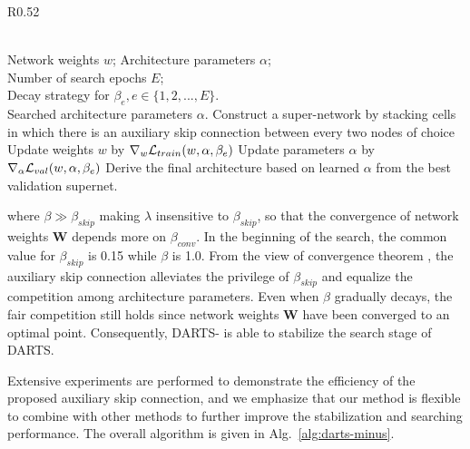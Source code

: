\documentclass{article} \usepackage{iclr2021_conference,times}
\begin{document}
\begin{wrapfigure}[17]{R}{0.52\textwidth}
\vspace{-22pt}
 \begin{minipage}{0.52\textwidth}
\begin{algorithm}[H]
	\caption{DARTS-}
	\label{alg:darts-minus}
	\begin{algorithmic}[1]
		\REQUIRE~~\\
		Network weights $w$; Architecture parameters $\alpha$;  \\
		Number of search epochs $E$; \\
		Decay strategy for $\beta_e, e\in\{ 1,2,..., E\}$.
                \ENSURE ~~\\
                Searched architecture parameters $\alpha$.
\STATE Construct a super-network by stacking cells in which there is an auxiliary skip connection between every two nodes of choice
		\STATE Update weights $w$ by  $\nabla_{w}{\cal L}_{train}(w, \alpha, \beta_e)$
		\STATE Update parameters $\alpha$  by  $\nabla_{\alpha }{\cal L}_{val}(w, \alpha, \beta_e)$
		\ENDFOR
\STATE Derive the final architecture based on learned $\alpha$ from the best validation supernet.
	\end{algorithmic}
\end{algorithm}
\end{minipage}
\end{wrapfigure}
where $\beta \gg \beta_{skip}$ making $\lambda$ insensitive to $\beta_{skip}$, so that the convergence of network weights $\mathbf{W}$ depends more on $\beta_{conv}$. In the beginning of the search,  the common value for $\beta_{skip} $ is 0.15 while $\beta$ is 1.0. From the view of convergence theorem \citep{zhou2020theory}, the auxiliary skip connection alleviates the privilege of $\beta_{skip}$ and equalize the competition among architecture parameters. Even when $\beta$ gradually decays, the fair competition still holds since network weights $\mathbf{W}$ have been converged to an optimal point. Consequently, DARTS- is able to stabilize the search stage of DARTS. 

Extensive experiments are performed to demonstrate the efficiency of the proposed auxiliary skip connection, and we emphasize that our method is flexible to combine with other methods to further improve the stabilization and searching performance. The overall algorithm is given in Alg.~\ref{alg:darts-minus}.
\end{document}
